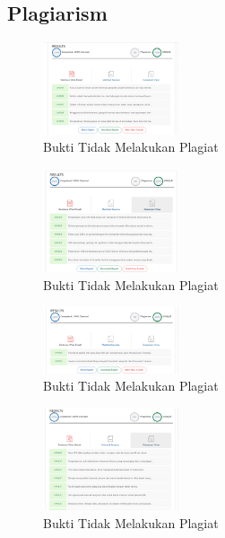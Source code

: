\subsection{Plagiarism}
\begin{figure}[H]
	\includegraphics[width=4cm]{figures/1174026/1/1.png}
	\centering
	\caption{Bukti Tidak Melakukan Plagiat}
\end{figure}
\begin{figure}[H]
	\includegraphics[width=4cm]{figures/1174026/1/2.png}
	\centering
	\caption{Bukti Tidak Melakukan Plagiat}
\end{figure}
\begin{figure}[H]
	\includegraphics[width=4cm]{figures/1174026/1/3.png}
	\centering
	\caption{Bukti Tidak Melakukan Plagiat}
\end{figure}
\begin{figure}[H]
	\includegraphics[width=4cm]{figures/1174026/1/4.png}
	\centering
	\caption{Bukti Tidak Melakukan Plagiat}
\end{figure}


